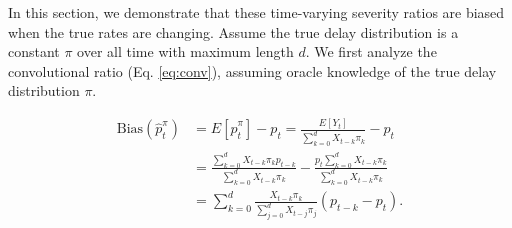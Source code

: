 \documentclass{article}
\begin{document}
In this section, we demonstrate that these time-varying severity ratios are biased when the true rates are changing. Assume the true delay distribution is a constant $\pi$ over all time with maximum length $d$. We first analyze the convolutional ratio (Eq. \ref{eq:conv}), assuming oracle knowledge of the true delay distribution $\pi$.


\begin{align}\label{eq:ConvBias}
    \text{Bias}(\hat{p}_t^\pi) &= E[\hat{p}_t^\pi] - p_t = \frac{E[Y_t]}{\sum_{k=0}^d X_{t-k}\pi_k} - p_t \nonumber\\ 
    &= \frac{\sum_{k=0}^d X_{t-k}\pi_k p_{t-k}}{\sum_{k=0}^d X_{t-k}\pi_k} - \frac{p_t \sum_{k=0}^d X_{t-k}\pi_k}{\sum_{k=0}^d X_{t-k}\pi_k}\nonumber\\
    &= \sum_{k=0}^d \frac{X_{t-k}\pi_k}{\sum_{j=0}^d X_{t-j}\pi_j} (p_{t-k}-p_t).
\end{align}
\end{document}
